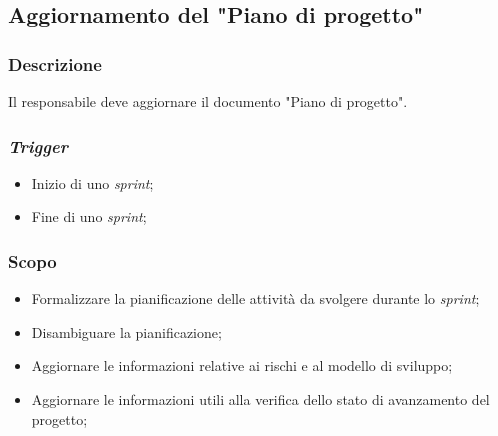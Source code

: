 \subsection{Aggiornamento del "Piano di progetto"}
\label{aggiornare-pdp}

\subsubsection{Descrizione}

Il responsabile deve aggiornare il documento "Piano di progetto".

\subsubsection{\textit{Trigger}}
\begin{itemize}
	\item Inizio di uno \textit{sprint}\g;
	\item Fine di uno \textit{sprint}\g;
\end{itemize}

\subsubsection{Scopo}
\begin{itemize}
	\item Formalizzare la pianificazione delle attività da svolgere durante
	      lo \textit{sprint}\g;

	\item Disambiguare la pianificazione;

	\item Aggiornare le informazioni relative ai rischi e al modello di
	      sviluppo;

	\item Aggiornare le informazioni utili alla verifica dello stato di
	      avanzamento del progetto;
\end{itemize}


